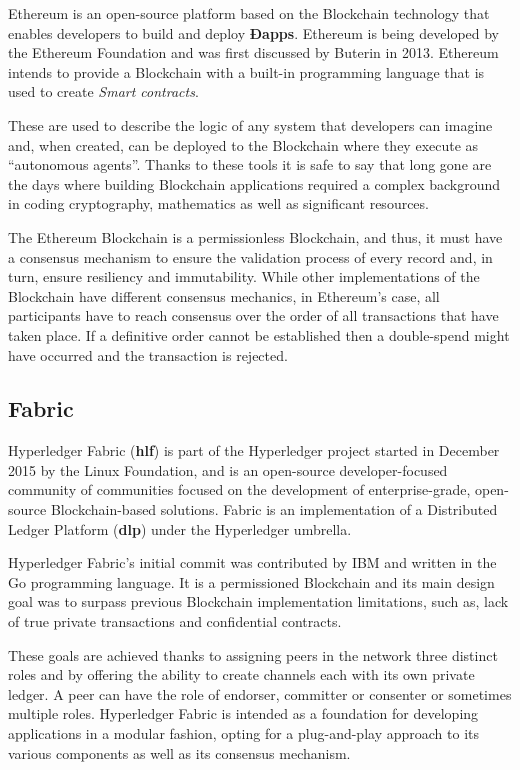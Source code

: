   Ethereum is an open-source platform based on the Blockchain technology that
  enables developers to build and deploy \textbf{Ðapps}. Ethereum is being
  developed by the Ethereum Foundation and was first discussed by Buterin in
  2013.  Ethereum intends to provide a Blockchain with a built-in programming
  language that is used to create \textit{Smart contracts}.  \cite{Wood2017}

  These are used to describe the logic of any system that developers can
  imagine and, when created, can be deployed to the Blockchain where they
  execute as “autonomous agents”.  Thanks to these tools it is safe to say that
  long gone are the days where building Blockchain applications required a
  complex background in coding cryptography, mathematics as well as significant
  resources.\cite{Wood2017,BlockGeeks2017}

  The Ethereum Blockchain is a permissionless Blockchain, and thus, it must
  have a consensus mechanism to ensure the validation process of every record
  and, in turn, ensure resiliency and immutability. While other implementations
  of the Blockchain have different consensus mechanics, in Ethereum’s case, all
  participants have to reach consensus over the order of all transactions that
  have taken place. If a definitive order cannot be established then a
  double-spend might have occurred and the transaction is rejected.

  \subsection{Fabric}

  Hyperledger Fabric (\textbf{hlf}) is part of the Hyperledger project started
  in December 2015 by the Linux Foundation, and is an open-source
  developer-focused community of communities focused on the development of
  enterprise-grade, open-source Blockchain-based solutions.  Fabric is an
  implementation of a Distributed Ledger Platform (\textbf{dlp}) under the
  Hyperledger umbrella.  \cite{Cachin2016}

  Hyperledger Fabric’s initial commit was contributed by IBM and written in the
  Go programming language.  It is a permissioned Blockchain and its main design
  goal was to surpass previous Blockchain implementation limitations, such as,
  lack of true private transactions and confidential contracts.

  These goals are achieved thanks to assigning peers in the network three
  distinct roles and by offering the ability to create channels each with its
  own private ledger.  A peer can have the role of endorser, committer or
  consenter or sometimes multiple roles.  Hyperledger Fabric is intended as a
  foundation for developing applications in a modular fashion, opting for a
  plug-and-play approach to its various components as well as its consensus
  mechanism. \cite{HyperledgerFabricDocs2017}

